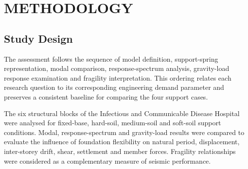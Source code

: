 \chapter{METHODOLOGY}
\section{Study Design}
The assessment follows the sequence of model definition, support-spring representation, modal comparison, response-spectrum analysis, gravity-load response examination and fragility interpretation. This ordering relates each research question to its corresponding engineering demand parameter and preserves a consistent baseline for comparing the four support cases.

The six structural blocks of the Infectious and Communicable Disease Hospital were analysed for fixed-base, hard-soil, medium-soil and soft-soil support conditions. Modal, response-spectrum and gravity-load results were compared to evaluate the influence of foundation flexibility on natural period, displacement, inter-storey drift, shear, settlement and member forces. Fragility relationships were considered as a complementary measure of seismic performance.

